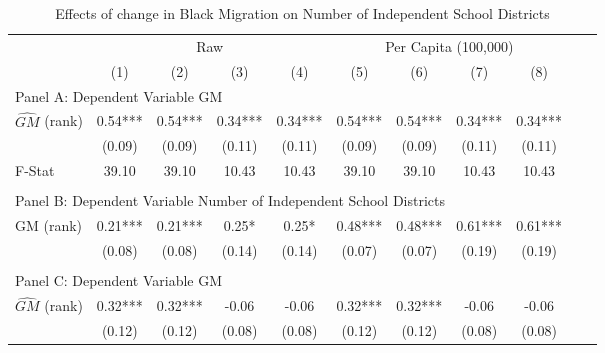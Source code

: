  \begin{table}[htbp]\centering {} \begin{threeparttable} \caption{Effects of change in Black Migration on Number of Independent School Districts} \begin{tabular}{l*{10}{c}} \toprule
                &\multicolumn{4}{c}{Raw}                                    &\multicolumn{4}{c}{Per Capita (100,000)}                   \\\cmidrule(lr){2-5}\cmidrule(lr){6-9}
                &\multicolumn{1}{c}{(1)}   &\multicolumn{1}{c}{(2)}   &\multicolumn{1}{c}{(3)}   &\multicolumn{1}{c}{(4)}   &\multicolumn{1}{c}{(5)}   &\multicolumn{1}{c}{(6)}   &\multicolumn{1}{c}{(7)}   &\multicolumn{1}{c}{(8)}   \\
\cmidrule(lr){1-9}
\multicolumn{8}{l}{Panel A: Dependent Variable GM}\\
\cmidrule(lr){1-9}
$\hat{GM}$ (rank)&       0.54***&       0.54***&       0.34***&       0.34***&       0.54***&       0.54***&       0.34***&       0.34***\\
                &     (0.09)   &     (0.09)   &     (0.11)   &     (0.11)   &     (0.09)   &     (0.09)   &     (0.11)   &     (0.11)   \\
\midrule
F-Stat          &      39.10   &      39.10   &      10.43   &      10.43   &      39.10   &      39.10   &      10.43   &      10.43   \\
\cmidrule[\heavyrulewidth](lr){1-9} \\ \cmidrule[\heavyrulewidth](lr){1-9}
\multicolumn{8}{l}{Panel B: Dependent Variable Number of Independent School Districts}\\
\cmidrule(lr){1-9}
GM  (rank)      &       0.21***&       0.21***&       0.25*  &       0.25*  &       0.48***&       0.48***&       0.61***&       0.61***\\
                &     (0.08)   &     (0.08)   &     (0.14)   &     (0.14)   &     (0.07)   &     (0.07)   &     (0.19)   &     (0.19)   \\
\cmidrule[\heavyrulewidth](lr){1-9} \\ \cmidrule[\heavyrulewidth](lr){1-9}
\multicolumn{8}{l}{Panel C: Dependent Variable GM}\\
\cmidrule(lr){1-9}
$\hat{GM}$ (rank)&       0.32***&       0.32***&      -0.06   &      -0.06   &       0.32***&       0.32***&      -0.06   &      -0.06   \\
                &     (0.12)   &     (0.12)   &     (0.08)   &     (0.08)   &     (0.12)   &     (0.12)   &     (0.08)   &     (0.08)   \\

\end{tabular}
\end{threeparttable}
\end{table}
